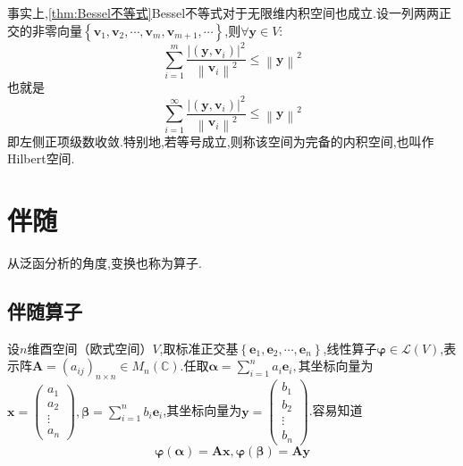 \begin{red}
\begin{remark}
    事实上,\cref{thm:Bessel不等式}\textup{Bessel}不等式对于无限维内积空间也成立.设一列两两正交的非零向量$\left\{
        \bm{v}_1,\bm{v}_2,\cdots,\bm{v}_m,\bm{v}_{m+1},\cdots
    \right\}$,则$\forall\bm{y}\in V:$\[
    \sum_{i=1}^{m}\frac{
        \left|\left(\bm{y},\bm{v}_i\right)\right|^2
    }{\left\lVert \bm{v}_i\right\rVert ^2}\leqslant\left\lVert \bm{y}\right\rVert ^2
    \]也就是\[
    \sum_{i=1}^{\infty}\frac{
        \left|\left(\bm{y},\bm{v}_i\right)\right|^2
    }{\left\lVert \bm{v}_i\right\rVert ^2}\leqslant\left\lVert \bm{y}\right\rVert ^2
    \]即左侧正项级数收敛.特别地,若等号成立,则称该空间为完备的内积空间,也叫作\textup{Hilbert}空间.
\end{remark}
\end{red}
\newpage
\section{伴随}
\begin{red}
    \begin{remark}
        从泛函分析的角度,变换也称为算子.
    \end{remark}
\end{red}
\subsection{伴随算子}
设$n$维酉空间（欧式空间）$V$,取标准正交基$\left\{
    \bm{e}_1,\bm{e}_2,\cdots,\bm{e}_n
\right\}$,线性算子$\bm{\varphi}\in \mathcal{L}\left(V\right)$,表示阵$\displaystyle\bm{A}=\left(a_{ij}\right)_{n\times n}\in M_n\left(\mathbb{C}\right)$.任取$\displaystyle\bm{\alpha}=\sum_{i=1}^{n}a_i\bm{e}_i,$其坐标向量为$\bm{x}=\begin{pmatrix}
    a_1\\a_2\\\vdots\\a_n
    \end{pmatrix},
    \bm{\beta}=\sum_{i=1}^{n}b_i\bm{e}_i
    $,其坐标向量为$\bm{y}=\begin{pmatrix}
        b_1\\b_2\\\vdots\\b_n
        \end{pmatrix}$.容易知道\[
        \bm{\varphi}\left(\bm{\alpha}\right)=\bm{Ax},\bm{\varphi}\left(\bm{\beta}\right)=\bm{Ay}
        \]

